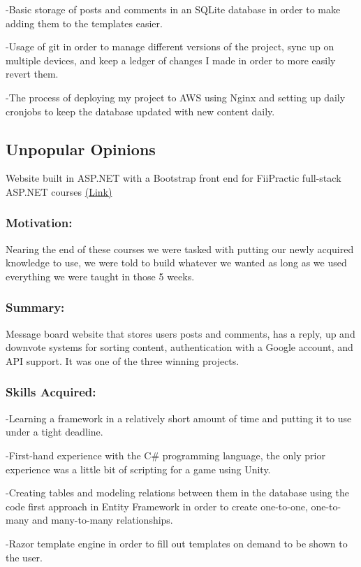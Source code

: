 \documentclass[a4paper,hidelinks,12pt]{article}
\begin{document}
-Basic storage of posts and comments in an SQLite database in order to make adding them to the templates easier.

-Usage of git in order to manage different versions of the project, sync up on multiple devices, and keep a
ledger of changes I made in order to more easily revert them.

-The process of deploying my project to AWS using Nginx and setting up daily cronjobs to keep the database updated with new
content daily.

\subsection{Unpopular Opinions}
Website built in ASP.NET with a Bootstrap front end for FiiPractic full-stack ASP.NET courses \href{https://github.com/IureaMarius/UnpopularOpinions}{(Link)}
\subsubsection{Motivation:}
Nearing the end of these courses we were tasked with putting our newly acquired knowledge to use, we were told
to build whatever we wanted as long as we used everything we were taught in those 5 weeks. 
\subsubsection{Summary:}
Message board website that stores users posts and comments, has a reply, up and downvote systems for sorting
content, authentication with a Google account, and API support. It was one of the three winning projects.
\subsubsection{Skills Acquired:}

-Learning a framework in a relatively short amount of time and putting it to use under a tight deadline.

-First-hand experience with the C\# programming language, the only prior experience was a little bit of 
scripting for a game using Unity.

-Creating tables and modeling relations between them in the database using the code first approach in Entity
Framework in order to create one-to-one, one-to-many and many-to-many relationships.

-Razor template engine in order to fill out templates on demand to be shown to the user.
\end{document}
